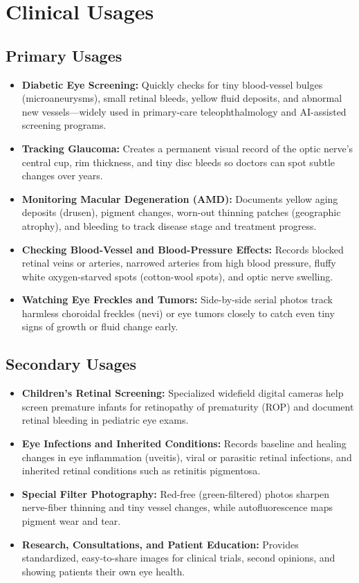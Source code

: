\section{Clinical Usages}

\subsection{Primary Usages}

\begin{itemize}
    \item \textbf{Diabetic Eye Screening:} Quickly checks for tiny blood-vessel bulges (microaneurysms), small retinal bleeds, yellow fluid deposits, and abnormal new vessels---widely used in primary-care teleophthalmology and AI-assisted screening programs.
    \item \textbf{Tracking Glaucoma:} Creates a permanent visual record of the optic nerve's central cup, rim thickness, and tiny disc bleeds so doctors can spot subtle changes over years.
    \item \textbf{Monitoring Macular Degeneration (AMD):} Documents yellow aging deposits (drusen), pigment changes, worn-out thinning patches (geographic atrophy), and bleeding to track disease stage and treatment progress.
    \item \textbf{Checking Blood-Vessel and Blood-Pressure Effects:} Records blocked retinal veins or arteries, narrowed arteries from high blood pressure, fluffy white oxygen-starved spots (cotton-wool spots), and optic nerve swelling.
    \item \textbf{Watching Eye Freckles and Tumors:} Side-by-side serial photos track harmless choroidal freckles (nevi) or eye tumors closely to catch even tiny signs of growth or fluid change early.
\end{itemize}

\subsection{Secondary Usages}

\begin{itemize}
    \item \textbf{Children's Retinal Screening:} Specialized widefield digital cameras help screen premature infants for retinopathy of prematurity (ROP) and document retinal bleeding in pediatric eye exams.
    \item \textbf{Eye Infections and Inherited Conditions:} Records baseline and healing changes in eye inflammation (uveitis), viral or parasitic retinal infections, and inherited retinal conditions such as retinitis pigmentosa.
    \item \textbf{Special Filter Photography:} Red-free (green-filtered) photos sharpen nerve-fiber thinning and tiny vessel changes, while autofluorescence maps pigment wear and tear.
    \item \textbf{Research, Consultations, and Patient Education:} Provides standardized, easy-to-share images for clinical trials, second opinions, and showing patients their own eye health.
\end{itemize}

